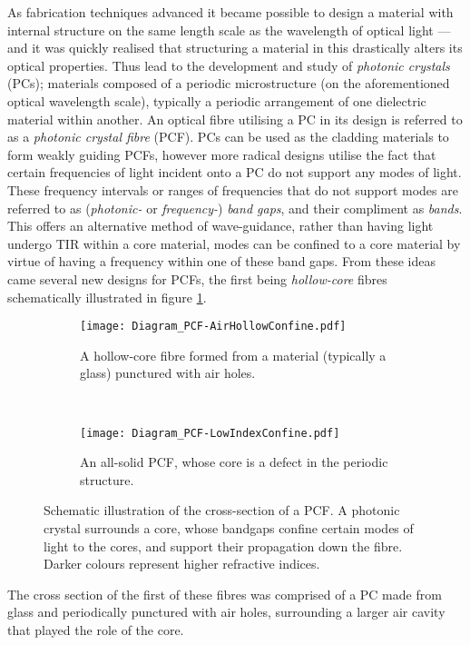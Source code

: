 As fabrication techniques advanced it became possible to design a material with internal structure on the same length scale as the wavelength of optical light --- and it was quickly realised that structuring a material in this drastically alters its optical properties.
Thus lead to the development and study of \emph{photonic crystals} (PCs); materials composed of a periodic microstructure (on the aforementioned optical wavelength scale), typically a periodic arrangement of one dielectric material within another.
An optical fibre utilising a PC in its design is referred to as a \emph{photonic crystal fibre} (PCF).
PCs can be used as the cladding materials to form weakly guiding PCFs, however more radical designs utilise the fact that certain frequencies of light incident onto a PC do not support any modes of light.
These frequency intervals or ranges of frequencies that do not support modes are referred to as (\emph{photonic-} or \emph{frequency-}) \emph{band gaps}, and their compliment as \emph{bands}.
This offers an alternative method of wave-guidance, rather than having light undergo TIR within a core material, modes can be confined to a core material by virtue of having a frequency within one of these band gaps.
From these ideas came several new designs for PCFs, the first being \emph{hollow-core} fibres schematically illustrated in figure \ref{fig:Diagram_PCF-AirHollowConfine.pdf}.
\begin{figure}[t]
	\centering
	\begin{subfigure}[t]{0.45\textwidth}
		\centering
		\texttt{[image: Diagram\_PCF-AirHollowConfine.pdf]}
		\caption[]{\label{fig:Diagram_PCF-AirHollowConfine.pdf} A hollow-core fibre formed from a material (typically a glass) punctured with air holes.}
	\end{subfigure}
	~
	\begin{subfigure}[t]{0.45\textwidth}
		\centering
		\texttt{[image: Diagram\_PCF-LowIndexConfine.pdf]}
		\caption[]{\label{fig:Diagram_PCF-LowIndexConfine.pdf} An all-solid PCF, whose core is a defect in the periodic structure.}
	\end{subfigure}
	\caption[Schematic illustration of the cross-section of a photonic crystal fibre.]{\label{fig:Diagram_PCF} Schematic illustration of the cross-section of a PCF. A photonic crystal surrounds a core, whose bandgaps confine certain modes of light to the cores, and support their propagation down the fibre. Darker colours represent higher refractive indices.}
\end{figure}
The cross section of the first of these fibres was comprised of a PC made from glass and periodically punctured with air holes, surrounding a larger air cavity that played the role of the core.

